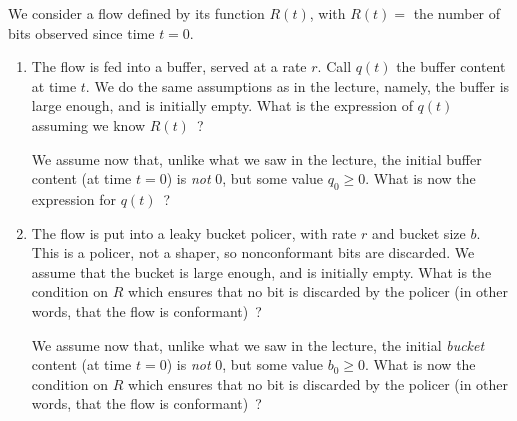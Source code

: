 \begin{problem}
 We consider a flow defined by
its function $R(t)$, with
                $R(t)=$ the number of bits observed since time $t=0$.
 \begin{enumerate}
  \item The
   flow is fed into a buffer, served at a rate $r$.  Call $q(t)$
   the buffer content at time $t$.  We do the same assumptions as
   in the lecture, namely, the buffer is large enough, and is
   initially empty. What is the expression of $q(t)$ assuming we
   know $R(t)$~?

   We assume now that, unlike what we saw in the lecture, the initial
   buffer content (at time $t=0$) is \emph{not} $0$, but some value $q_{0}
   \geq 0$. What is now the expression for $q(t)$~?
 \item The flow is put into a leaky bucket policer, with rate
 $r$ and bucket size $b$.  This is a policer, not a shaper, so
 nonconformant bits are discarded.  We assume that the bucket
 is large enough, and is initially empty.  What is the
 condition on $R$ which ensures that no bit is discarded by the
 policer (in other words, that the flow is conformant)~?

 We assume now that, unlike what we saw in the lecture, the
 initial \emph{bucket} content (at time $t=0$) is \emph{not}
 $0$, but some value $b_{0} \geq 0$.  What is now the condition
 on $R$ which ensures that no bit is discarded by the policer
 (in other words, that the flow is conformant)~?
\end{enumerate}
\end{problem}%
